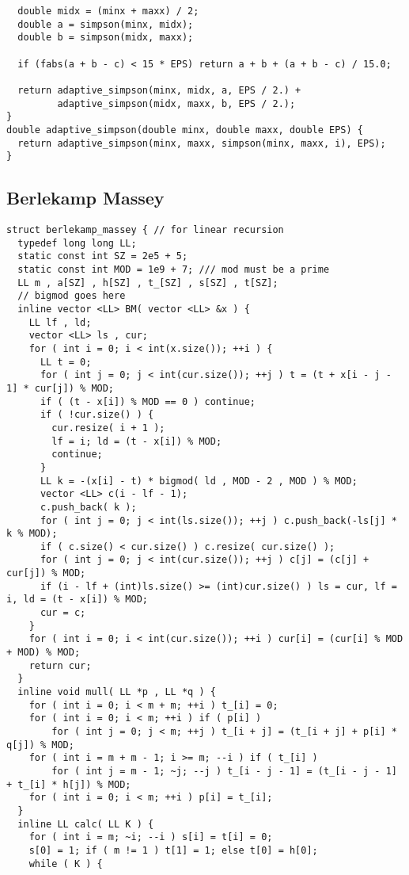 \documentclass[FSZ,a4paper,onesided]{article}
\begin{document}
\begin{multicols*}{\COLS}
\begin{lstlisting}
  double midx = (minx + maxx) / 2;
  double a = simpson(minx, midx);
  double b = simpson(midx, maxx);

  if (fabs(a + b - c) < 15 * EPS) return a + b + (a + b - c) / 15.0;

  return adaptive_simpson(minx, midx, a, EPS / 2.) +
         adaptive_simpson(midx, maxx, b, EPS / 2.);
}
double adaptive_simpson(double minx, double maxx, double EPS) {
  return adaptive_simpson(minx, maxx, simpson(minx, maxx, i), EPS);
}

\end{lstlisting}
\subsection{Berlekamp Massey}
\begin{lstlisting}
struct berlekamp_massey { // for linear recursion
  typedef long long LL;
  static const int SZ = 2e5 + 5;
  static const int MOD = 1e9 + 7; /// mod must be a prime
  LL m , a[SZ] , h[SZ] , t_[SZ] , s[SZ] , t[SZ];
  // bigmod goes here
  inline vector <LL> BM( vector <LL> &x ) {
    LL lf , ld;
    vector <LL> ls , cur;
    for ( int i = 0; i < int(x.size()); ++i ) {
      LL t = 0;
      for ( int j = 0; j < int(cur.size()); ++j ) t = (t + x[i - j - 1] * cur[j]) % MOD;
      if ( (t - x[i]) % MOD == 0 ) continue;
      if ( !cur.size() ) {
        cur.resize( i + 1 );
        lf = i; ld = (t - x[i]) % MOD;
        continue;
      }
      LL k = -(x[i] - t) * bigmod( ld , MOD - 2 , MOD ) % MOD;
      vector <LL> c(i - lf - 1);
      c.push_back( k );
      for ( int j = 0; j < int(ls.size()); ++j ) c.push_back(-ls[j] * k % MOD);
      if ( c.size() < cur.size() ) c.resize( cur.size() );
      for ( int j = 0; j < int(cur.size()); ++j ) c[j] = (c[j] + cur[j]) % MOD;
      if (i - lf + (int)ls.size() >= (int)cur.size() ) ls = cur, lf = i, ld = (t - x[i]) % MOD;
      cur = c;
    }
    for ( int i = 0; i < int(cur.size()); ++i ) cur[i] = (cur[i] % MOD + MOD) % MOD;
    return cur;
  }
  inline void mull( LL *p , LL *q ) {
    for ( int i = 0; i < m + m; ++i ) t_[i] = 0;
    for ( int i = 0; i < m; ++i ) if ( p[i] )
        for ( int j = 0; j < m; ++j ) t_[i + j] = (t_[i + j] + p[i] * q[j]) % MOD;
    for ( int i = m + m - 1; i >= m; --i ) if ( t_[i] )
        for ( int j = m - 1; ~j; --j ) t_[i - j - 1] = (t_[i - j - 1] + t_[i] * h[j]) % MOD;
    for ( int i = 0; i < m; ++i ) p[i] = t_[i];
  }
  inline LL calc( LL K ) {
    for ( int i = m; ~i; --i ) s[i] = t[i] = 0;
    s[0] = 1; if ( m != 1 ) t[1] = 1; else t[0] = h[0];
    while ( K ) {

\end{lstlisting}
\end{multicols*}
\end{document}
